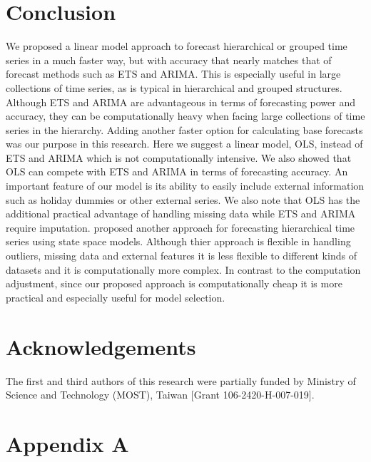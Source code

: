 \documentclass[11pt,a4paper,]{article}
\begin{document}
\hypertarget{conclusion}{%
\section{Conclusion}\label{conclusion}}

We proposed a linear model approach to forecast hierarchical or grouped
time series in a much faster way, but with accuracy that nearly matches
that of forecast methods such as ETS and ARIMA. This is especially
useful in large collections of time series, as is typical in
hierarchical and grouped structures. Although ETS and ARIMA are
advantageous in terms of forecasting power and accuracy, they can be
computationally heavy when facing large collections of time series in
the hierarchy. Adding another faster option for calculating base
forecasts was our purpose in this research. Here we suggest a linear
model, OLS, instead of ETS and ARIMA which is not computationally
intensive. We also showed that OLS can compete with ETS and ARIMA in
terms of forecasting accuracy. An important feature of our model is its
ability to easily include external information such as holiday dummies
or other external series. We also note that OLS has the additional
practical advantage of handling missing data while ETS and ARIMA require
imputation. \textcite{pennings2017} proposed another approach for
forecasting hierarchical time series using state space models. Although
thier approach is flexible in handling outliers, missing data and
external features it is less flexible to different kinds of datasets and
it is computationally more complex. In contrast to the computation
adjustment, since our proposed approach is computationally cheap it is
more practical and especially useful for model selection.

\hypertarget{acknowledgements}{%
\section*{Acknowledgements}\label{acknowledgements}}

The first and third authors of this research were partially funded by
Ministry of Science and Technology (MOST), Taiwan {[}Grant
106-2420-H-007-019{]}.

\clearpage

\hypertarget{appendixA}{%
\section*{Appendix A}\label{appendixA}}
\end{document}
